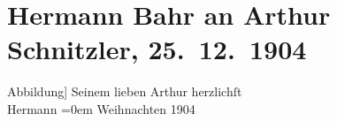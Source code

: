 

         \renewcommand{\erwaehnteOrte}{Orte: Wien}
         \renewcommand{\erwaehnteWerke}{}
               \section[Hermann Bahr an Arthur Schnitzler, 25. 12. 1904]{ Hermann Bahr an Arthur Schnitzler, 25. 12. 1904}\nopagebreak{}\rehead{ }\begin{ledgroupsized}[t]{13cm}\normalsize\beginnumbering \toendnotes[C]{\smallbreak\pagebreak[2]} 
\pstart{[}Abbildung{]}\pend\pstart
           \noindent{}{\pb}Seinem lieben Arthur\pend
           \pstart
           herzlichſt{\\[\baselineskip]}\spacefill\mbox{Hermann}\pend
           \leftskip=0em{}\pstart
           Weihnachten 1904\pend
           
         
         \endnumbering{}\end{ledgroupsized}  \newcommand{\dateiname}{L01483}\newcommand{\titel}{Hermann Bahr an Arthur Schnitzler, 25. 12. 1904}\newcommand{\editorInnen}{ Kurt Ifkovits,  Martin Anton Müller}
      